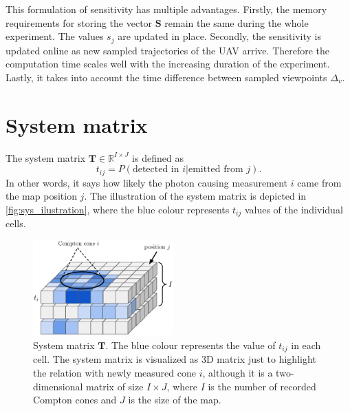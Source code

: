 This formulation of sensitivity has multiple advantages.
Firstly, the memory requirements for storing the vector $\mathbf{S}$ remain the same during the whole experiment. The values $s_{j}$ are updated in place.
Secondly, the sensitivity is updated online as new sampled trajectories of the \ac{UAV} arrive. Therefore the computation time scales well with the increasing duration of the experiment.
Lastly, it takes into account the time difference between sampled viewpoints $\Delta_{v}$.%

\section{System matrix}
\label{sec:system}
The system matrix $\mathbf{T} \in \mathbb{R}^{I \times J}$ is defined as
\begin{equation}
t_{ij} =  P(\textrm{detected in } i | \textrm{emitted from } j).
\end{equation}
In other words, it says how likely the photon causing measurement $i$ came from the map position $j$.
The illustration of the system matrix is depicted in  \autoref{fig:sys_ilustration}, where the blue colour represents $t_{ij}$ values of the individual cells. 
\begin{figure}[!h]
  \centering
    \includegraphics[width=0.48\textwidth]{./fig/photos/systemmmm.eps}
  \caption{System matrix $\mathbf{T}$. The blue colour represents the value of $t_{ij}$ in each cell. The system matrix is visualized as 3D matrix just to highlight the relation with newly measured cone $i$, although it is a two-dimensional matrix of size $I \times J$, where $I$ is the number of recorded Compton cones and $J$ is the size of the map. }
    \label{fig:sys_ilustration}
\end{figure}


